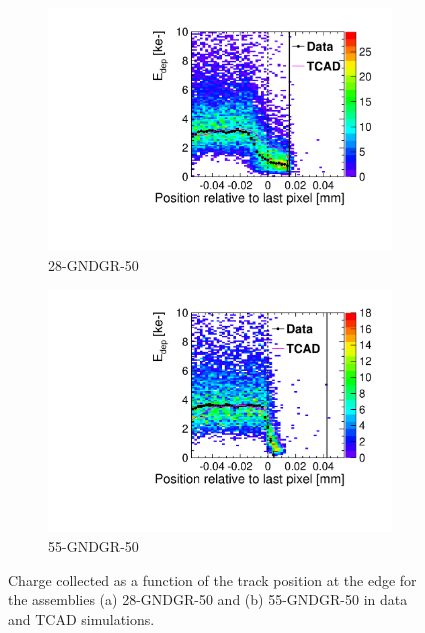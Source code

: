 \begin{figure}[htbp]
  \begin{subfigure}[b]{0.45\textwidth}
    \centering
    \includegraphics[width=\textwidth]{figures/ActiveEdge/28_GNDGR_Edep_TCAD_data.pdf}
    \caption{28-GNDGR-50}
  \end{subfigure}\hfill
  \begin{subfigure}[b]{0.45\textwidth}
    \centering
    \includegraphics[width=\textwidth]{figures/ActiveEdge/55_GNDGR_Edep_TCAD_data.pdf}
    \caption{55-GNDGR-50}
  \end{subfigure}
  \caption{Charge collected as a function of the track position at the
    edge for the assemblies (a) 28-GNDGR-50 and (b) 55-GNDGR-50 in
    data and TCAD simulations.}
  \label{fig:ChargeCollectionNGRFGR_50}
\end{figure}


